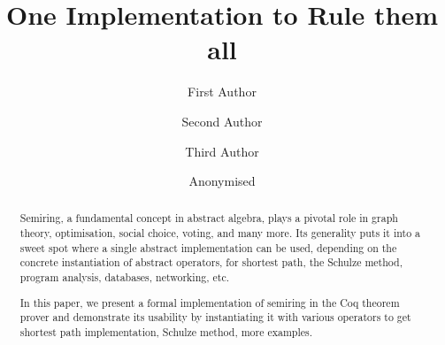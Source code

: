 \documentclass[runningheads]{llncs}
\newif\ifFinal
\begin{document}
%
\title{One Implementation to Rule them all}
%
%
%
%
%

\ifFinal
\author{First Author \and
Second Author \and
Third Author}
%
%
%
\else
\author{Anonymised}

\maketitle              %
%
\begin{abstract}
  Semiring, a fundamental concept in abstract algebra, plays
  a pivotal role in graph theory, optimisation, social choice, voting, 
  and many more. Its generality puts it into a sweet spot 
  where a single abstract implementation can be used, depending 
  on the concrete instantiation of abstract operators, 
  for shortest path, the Schulze method, program analysis, 
  databases, networking, etc. 

  In this paper, we present a formal implementation of semiring in the Coq 
  theorem prover and demonstrate its usability by instantiating it
  with various operators to 
  get shortest path implementation, Schulze method, more examples. 

  


  
\end{abstract}
\end{document}
